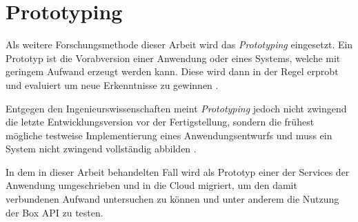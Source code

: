 \section{Prototyping}

Als weitere Forschungsmethode dieser Arbeit wird das \textit{Prototyping} eingesetzt.
Ein Prototyp ist die Vorabversion einer Anwendung oder eines Systems, welche mit geringem Aufwand erzeugt werden kann.
Diese wird dann in der Regel erprobt und evaluiert um neue Erkenntnisse zu gewinnen \cite[Vgl.][S. 282]{Wilde2007}\cite[Vgl.][S. 114]{Heinrich2011}.

Entgegen den Ingenieurswissenschaften meint \textit{Prototyping} jedoch nicht zwingend die letzte Entwicklungsversion vor der
Fertigstellung, sondern die frühest mögliche testweise Implementierung eines Anwendungsentwurfs \cite[Vgl.][S. 114]{Heinrich2011}
und muss ein System nicht zwingend vollständig abbilden \cite[Vgl.][S. 119]{Heinrich2011}.

In dem in dieser Arbeit behandelten Fall wird als Prototyp einer der Services der Anwendung umgeschrieben und in die Cloud migriert,
um den damit verbundenen Aufwand untersuchen zu können und unter anderem die Nutzung der Box API zu testen.